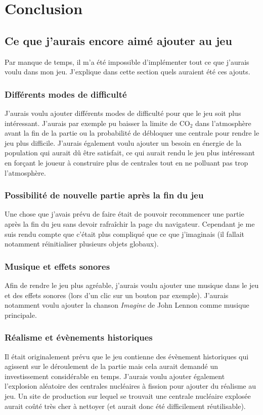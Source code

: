 \documentclass{article}
\begin{document}
        \section{Conclusion}
        \subsection{Ce que j'aurais encore aimé ajouter au jeu} \label{ajoutJeu}
		Par manque de temps, il m'a été impossible d'implémenter tout ce que j'aurais voulu dans mon jeu. J'explique dans cette section quels auraient été ces ajouts.
		
		\subsubsection{Différents modes de difficulté}
		J'aurais voulu ajouter différents modes de difficulté pour que le jeu soit plus intéressant. J'aurais par exemple pu baisser la limite de CO$_{2}$ dans l'atmosphère avant la fin de la partie ou la probabilité de débloquer une centrale pour rendre le jeu plus difficile. J'aurais également voulu ajouter un besoin en énergie de la population qui aurait dû être satisfait, ce qui aurait rendu le jeu plus intéressant en forçant le joueur à construire plus de centrales tout en ne polluant pas trop l'atmosphère.
		
		\subsubsection{Possibilité de nouvelle partie après la fin du jeu}
		Une chose que j'avais prévu de faire était de pouvoir recommencer une partie après la fin du jeu sans devoir rafraîchir la page du navigateur. Cependant je me suis rendu compte que c'était plus compliqué que ce que j'imaginais (il fallait notamment réinitialiser plusieurs objets globaux).		
		
		\subsubsection{Musique et effets sonores}
		Afin de rendre le jeu plus agréable, j'aurais voulu ajouter une musique dans le jeu et des effets sonores (lors d'un clic sur un bouton par exemple). J'aurais notamment voulu ajouter la chanson \textit{Imagine} de John Lennon comme musique principale. 
		
		\subsubsection{Réalisme et évènements historiques}
		Il était originalement prévu que le jeu contienne des évènement historiques qui agissent sur le déroulement de la partie mais cela aurait demandé un investissement considérable en temps.
		J'aurais voulu ajouter également l'explosion aléatoire des centrales nucléaires à fission pour ajouter du réalisme au jeu. Un site de production sur lequel se trouvait une centrale nucléaire explosée aurait coûté très cher à nettoyer (et aurait donc été difficilement réutilisable).
		
\end{document}
